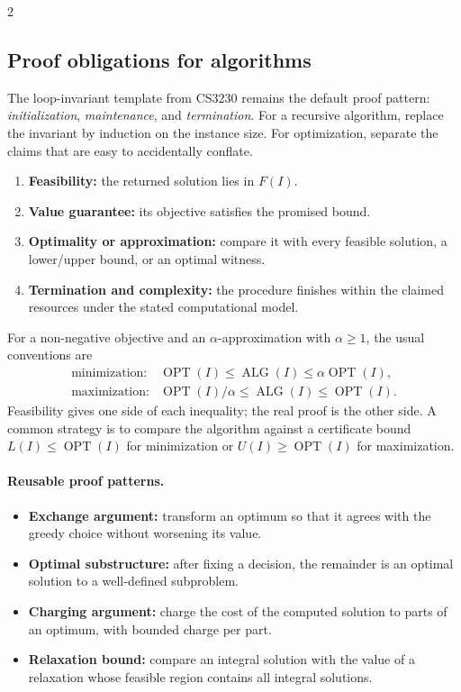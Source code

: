 \documentclass[8pt]{extarticle}
\theoremstyle{definition}
\newcommand{\OPT}{\operatorname{OPT}}
\newcommand{\ALG}{\operatorname{ALG}}
\begin{document}
\begin{multicols*}{2}
\subsection{Proof obligations for algorithms}

The loop-invariant template from CS3230 remains the default proof pattern:
\emph{initialization}, \emph{maintenance}, and \emph{termination}.  For a
recursive algorithm, replace the invariant by induction on the instance size.
For optimization, separate the claims that are easy to accidentally conflate.

\begin{enumerate}
  \item \textbf{Feasibility:} the returned solution lies in $F(I)$.
  \item \textbf{Value guarantee:} its objective satisfies the promised bound.
  \item \textbf{Optimality or approximation:} compare it with every feasible
        solution, a lower/upper bound, or an optimal witness.
  \item \textbf{Termination and complexity:} the procedure finishes within the
        claimed resources under the stated computational model.
\end{enumerate}

For a non-negative objective and an $\alpha$-approximation with $\alpha\ge1$,
the usual conventions are
\[
\begin{array}{ll}
\text{minimization:} & \OPT(I)\le\ALG(I)\le\alpha\OPT(I),\\[2pt]
\text{maximization:} & \OPT(I)/\alpha\le\ALG(I)\le\OPT(I).
\end{array}
\]
Feasibility gives one side of each inequality; the real proof is the other
side.  A common strategy is to compare the algorithm against a certificate
bound $L(I)\le\OPT(I)$ for minimization or $U(I)\ge\OPT(I)$ for maximization.

\paragraph{Reusable proof patterns.}
\begin{itemize}
  \item \textbf{Exchange argument:} transform an optimum so that it agrees
        with the greedy choice without worsening its value.
  \item \textbf{Optimal substructure:} after fixing a decision, the remainder
        is an optimal solution to a well-defined subproblem.
  \item \textbf{Charging argument:} charge the cost of the computed solution
        to parts of an optimum, with bounded charge per part.
  \item \textbf{Relaxation bound:} compare an integral solution with the value
        of a relaxation whose feasible region contains all integral solutions.
\end{itemize}


\end{multicols*}
\end{document}
